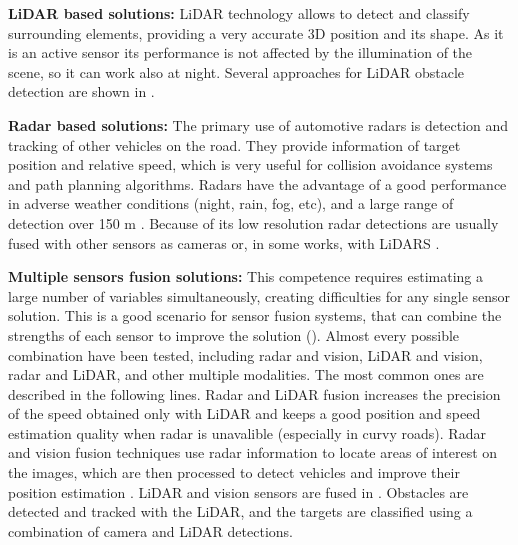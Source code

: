 \textbf{LiDAR based solutions:}
LiDAR technology allows to detect and classify surrounding elements, providing
a very accurate 3D position and its shape. 
As it is an active sensor its performance is not affected by the illumination 
of the scene, so it can work also at night. Several approaches for LiDAR 
obstacle detection are shown in \cite{li2016vehicle}.

\textbf{Radar based solutions:}
The primary use of automotive radars is detection and tracking of other 
vehicles on the road. They provide information of target position and relative 
speed, which is very useful for collision avoidance systems and path planning
algorithms. 
Radars have the advantage of a good performance in adverse weather conditions 
(night, rain, fog, etc), and a large range of detection over 150 m
\cite{blanc2004obstacle}. Because of its low resolution radar detections are
usually fused with other sensors as cameras \cite{garcia2012data} or, in some
works, with LiDARS \cite{gohring2011radar}.


\textbf{Multiple sensors fusion solutions:}
This competence requires estimating a large number of variables simultaneously,
creating difficulties for any single sensor solution. This is a good scenario
for sensor fusion systems, that can combine the strengths of each sensor to
improve the solution (). 
Almost every possible combination have been tested, including radar and vision, 
LiDAR and vision, radar and LiDAR, and other multiple 
modalities. The most common ones are described in the following lines.
Radar and LiDAR fusion \cite{gohring2011radar} increases the precision of 
the speed obtained only with LiDAR and keeps a good position and speed 
estimation quality when radar is unavalible (especially in curvy roads).
Radar and vision fusion techniques use radar information to locate areas of 
interest on the images, which are then processed to detect vehicles and improve 
their position estimation \cite{alessandretti2007vehicle}.
LiDAR and vision sensors are fused in \cite{premebida2007lidar}. Obstacles
are detected and tracked with the LiDAR, and the targets are classified using
a combination of camera and LiDAR detections.

